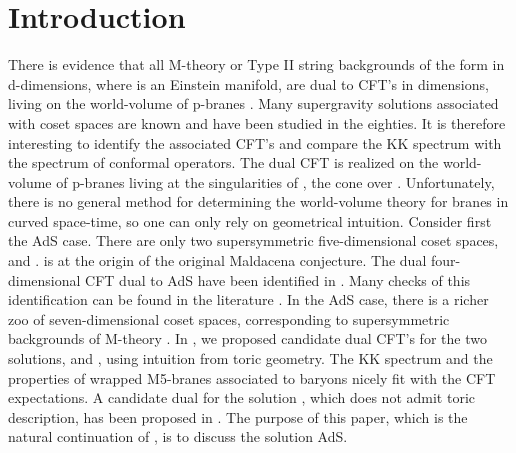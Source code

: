 \documentclass[a4paper,12pt]{article}
\def\n010{N^{0,1,0}}
\begin{document}
\section{Introduction}
There is  evidence that all M-theory or Type II string backgrounds
of the form \coordHE{} in d-dimensions, where
\coordHE{} is an Einstein manifold, are dual to CFT's in \coordHE{}
dimensions, living on the world-volume of p-branes \cite{review}.
Many supergravity solutions associated with coset spaces  \coordHE{}
are known and have been studied in the eighties.
It is therefore interesting to identify the associated CFT's and compare
the KK spectrum with the spectrum of conformal operators.
The dual CFT is realized on the world-volume of p-branes living at the
singularities of \coordHE{}, the cone over \coordHE{}
\cite{witkleb,fig,morpless}.
Unfortunately, there is no general method for determining the world-volume
theory for branes in curved space-time, so one can only rely on geometrical
intuition.
Consider first the AdS\coordHE{} case.
There are only two supersymmetric five-dimensional coset spaces, \coordHE{}
and \coordHE{}. \coordHE{} is at the origin of the original Maldacena conjecture.
The dual four-dimensional CFT dual to AdS\coordHE{} have been
identified in \cite{witkleb}.
Many checks of this identification can be found in the literature
\cite{witkleb,gubser,gubserkleb,sergiotorino}.
In the AdS\coordHE{} case, there is a richer zoo of seven-dimensional coset spaces,
corresponding to supersymmetric backgrounds of M-theory \cite{castromwar}.
In \cite{3dcft}, we proposed candidate dual CFT's for the two \coordHE{}
solutions, \coordHE{} \cite{q111} and \coordHE{} \cite{m111}, using
intuition from toric geometry.
The KK spectrum and the properties of wrapped M5-branes associated to
baryons nicely fit with the CFT expectations.
A candidate dual for the \coordHE{} solution \coordHE{}, which does not
admit toric description, has been proposed in \cite{poliv52}.
The purpose of this paper, which is the natural continuation of \cite{3dcft},
is to discuss the  \coordHE{} solution AdS\myHighlight{$_4\times \n010$}\coordHE{}.
\par
\end{document}
